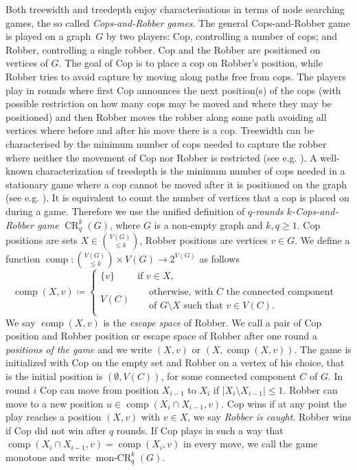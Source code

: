 \documentclass{lmcs}
\theoremstyle{plain}\newtheorem{claim}[thm]{Claim}   %
\DeclareMathOperator{\CR}{CR}
\DeclareMathOperator{\monCR}{mon-CR}
\newcommand{\CRkq}{\CR^k_q}
\newcommand{\monCRkq}{\monCR^k_q}
\DeclareMathOperator{\escape}{comp}
\begin{document}
Both treewidth and treedepth enjoy characterisations in terms of node searching games, the so called \emph{Cops-and-Robber games}.
The general Cops-and-Robber game is played on a graph~$G$ by two players: Cop, controlling a number of cops; and Robber, controlling a single robber.
Cop and the Robber are positioned on vertices of $G$.
The goal of Cop is to place a cop on Robber's position, while Robber tries to avoid capture by moving along paths free from cops.
The players play in rounds where first Cop announces the next position(s) of the cops (with possible restriction on how many cops may be moved and where they may be positioned) and then Robber moves the robber along some path avoiding all vertices where before and after his move there is a cop.
Treewidth can be characterised by the minimum number of cops needed to capture the robber where neither the movement of Cop nor Robber is restricted (see e.g. \cite{Seymour_graph_1993}).
A well-known characterization of treedepth is the minimum number of cops needed in a stationary game where a cop cannot be moved after it is positioned on the graph (see e.g. \cite{Giannopoulou_lifo-search_2012}).
It is equivalent to count the number of vertices that a cop is placed on during a game.
Therefore we use the unified definition of \emph{$q$-rounds $k$-Cops-and-Robber game} $\CRkq(G)$, where $G$ is a non-empty graph and $k,q\geq 1$.
Cop positions are sets $X\in \binom{V(G)}{\leq k}$, Robber positions are vertices $v\in G$.
We define a function $\escape\colon \binom{V(G)}{\leq k}\times V(G) \rightarrow 2^{V(G)}$ as follows
\begin{equation*}
	\escape(X,v) \coloneqq \begin{cases}
		\{v\} & \text{if } v\in X,\\
		V(C) & \begin{split}
			&\text{otherwise, with } C \text{ the connected component }\\
			&\text{of } G\setminus X \text{ such that } v\in V(C).
		\end{split}
	\end{cases}
\end{equation*}
We say $\escape(X,v)$ is the \emph{escape space} of Robber.
We call a pair of Cop position and Robber position or escape space of Robber after one round a \emph{positions of the game} and we write $(X,v)$ or $(X,\escape(X,v))$.
The game is initialized with Cop on the empty set and Robber on a vertex of his choice, that is the initial position is $(\emptyset,V(C))$, for some connected component $C$ of $G$.
In round $i$ Cop can move from position $X_{i-1}$ to $X_i$ if $|X_i\setminus X_{i-1}|\leq1$.
Robber can move to a new position $u\in \escape(X_i\cap X_{i-1},v)$.
Cop wins if at any point the play reaches a position $(X,v)$ with $v\in X$, we say \emph{Robber is caught}.
Robber wins if Cop did not win after $q$ rounds.
If Cop plays in such a way that $\escape(X_i\cap X_{i-1},v)=\escape(X_i,v)$ in every move, we call the game monotone and write $\monCRkq(G)$.
\end{document}
